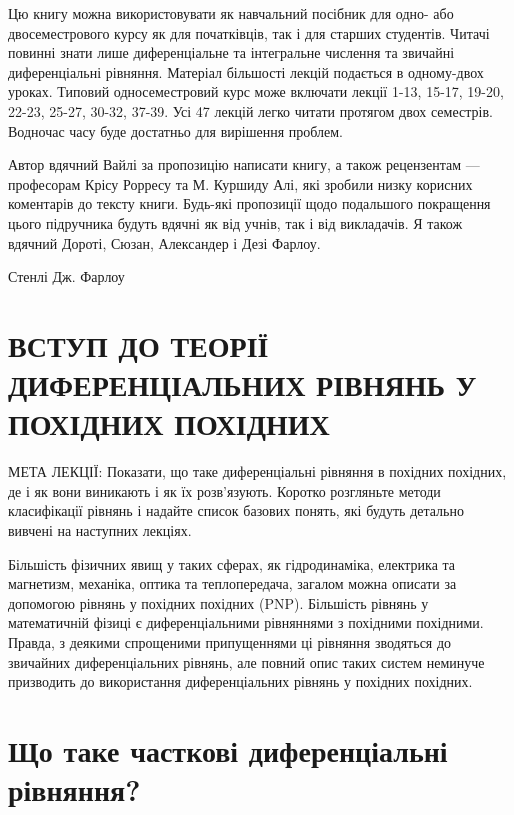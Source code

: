 \documentclass[
  ukrainian,
]{article}
\begin{document}
Цю книгу можна використовувати як навчальний посібник для одно- або
двосеместрового курсу як для початківців, так і для старших студентів.
Читачі повинні знати лише диференціальне та інтегральне числення та
звичайні диференціальні рівняння. Матеріал більшості лекцій подається в
одному-двох уроках. Типовий односеместровий курс може включати лекції
1-13, 15-17, 19-20, 22-23, 25-27, 30-32, 37-39. Усі 47 лекцій легко
читати протягом двох семестрів. Водночас часу буде достатньо для
вирішення проблем.

Автор вдячний Вайлі за пропозицію написати книгу, а також рецензентам
--- професорам Крісу Рорресу та М. Куршиду Алі, які зробили низку
корисних коментарів до тексту книги. Будь-які пропозиції щодо подальшого
покращення цього підручника будуть вдячні як від учнів, так і від
викладачів. Я також вдячний Дороті, Сюзан, Александер і Дезі Фарлоу.

Стенлі Дж. Фарлоу

\section{ВСТУП ДО ТЕОРІЇ ДИФЕРЕНЦІАЛЬНИХ РІВНЯНЬ У ПОХІДНИХ
ПОХІДНИХ}\label{ux432ux441ux442ux443ux43f-ux434ux43e-ux442ux435ux43eux440ux456ux457-ux434ux438ux444ux435ux440ux435ux43dux446ux456ux430ux43bux44cux43dux438ux445-ux440ux456ux432ux43dux44fux43dux44c-ux443-ux43fux43eux445ux456ux434ux43dux438ux445-ux43fux43eux445ux456ux434ux43dux438ux445}

МЕТА ЛЕКЦІЇ: Показати, що таке диференціальні рівняння в похідних
похідних, де і як вони виникають і як їх розв'язують. Коротко розгляньте
методи класифікації рівнянь і надайте список базових понять, які будуть
детально вивчені на наступних лекціях.

Більшість фізичних явищ у таких сферах, як гідродинаміка, електрика та
магнетизм, механіка, оптика та теплопередача, загалом можна описати за
допомогою рівнянь у похідних похідних (PNP). Більшість рівнянь у
математичній фізиці є диференціальними рівняннями з похідними похідними.
Правда, з деякими спрощеними припущеннями ці рівняння зводяться до
звичайних диференціальних рівнянь, але повний опис таких систем неминуче
призводить до використання диференціальних рівнянь у похідних похідних.

\section{Що таке часткові диференціальні
рівняння?}\label{ux449ux43e-ux442ux430ux43aux435-ux447ux430ux441ux442ux43aux43eux432ux456-ux434ux438ux444ux435ux440ux435ux43dux446ux456ux430ux43bux44cux43dux456-ux440ux456ux432ux43dux44fux43dux43dux44f}
\end{document}
